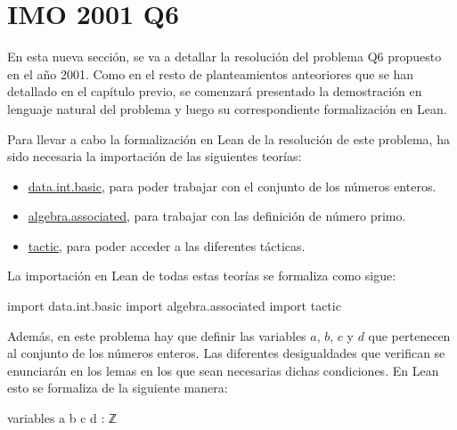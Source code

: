 \section{IMO 2001 Q6}

En esta nueva sección, se va a detallar la resolución del problema Q6
propuesto en el año 2001. Como en el resto de planteamientos anteoriores
que se han detallado en el capítulo previo, se comenzará presentado la
demostración en lenguaje natural del problema y luego su correspondiente
formalización en Lean.

\noindent
{}

Para llevar a cabo la formalización en Lean de la resolución de este
problema, ha sido necesaria la importación de las siguientes teorías:
\begin{itemize}
\item \href{https://github.com/leanprover-community/mathlib/blob/master/src/data/int/basic.lean}{data.int.basic}, para poder trabajar con el conjunto
  de los números enteros.
\item \href{https://github.com/leanprover-community/mathlib/blob/master/src/algebra/associated.lean}{algebra.associated}, para trabajar con las
  definición de número primo.
\item \href{https://github.com/leanprover-community/mathlib/tree/master/src/tactic}{tactic}, para poder acceder a las diferentes tácticas.
\end{itemize}

La importación en Lean de todas estas teorías se formaliza como sigue:
\begin{leancode}
import data.int.basic
import algebra.associated
import tactic
\end{leancode}

Además, en este problema hay que definir las variables \(a\), \(b\), \(c\) y
\(d\) que pertenecen al conjunto de los números enteros. Las diferentes
desigualdades que verifican se enunciarán en los lemas en los que sean
necesarias dichas condiciones. En Lean esto se formaliza de la siguiente
manera:
\begin{leancode}
variables {a b c d : ℤ}
\end{leancode}

